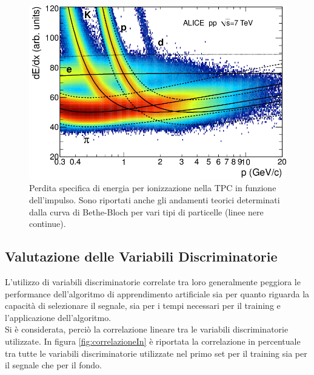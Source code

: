         
   
   \begin{figure}[htbp]
        \centering
        \includegraphics[width=0.7\linewidth]{training&testing/Specific-energy-loss-in-the-TPC.png}
        \caption{ Perdita specifica di energia per ionizzazione nella TPC in funzione dell'impulso. Sono riportati anche gli andamenti teorici determinati dalla curva di Bethe-Bloch per vari tipi di particelle (linee nere continue).}
        \label{fig:BBnellaTPC}
    \end{figure}
   
  
  \subsection{Valutazione delle Variabili Discriminatorie}
  
    L'utilizzo di variabili discriminatorie correlate tra loro generalmente peggiora le performance dell'algoritmo di apprendimento artificiale sia per quanto riguarda la capacit\`a di selezionare il segnale, sia per i tempi necessari per il training e l'applicazione dell'algoritmo.  
    \\Si \`e considerata, perci\`o la correlazione lineare tra le variabili discriminatorie utilizzate. In figura \ref{fig:correlazioneIn} \`e riportata la correlazione in percentuale tra tutte le variabili discriminatorie utilizzate nel primo set per il training sia per il segnale che per il fondo.
   
